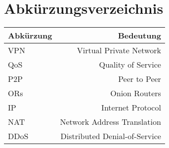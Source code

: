 \section{Abkürzungsverzeichnis}

\begin{tabular}{l|r}
    Abkürzung & Bedeutung \\
    \hline
    VPN & Virtual Private Network \\
    QoS & Quality of Service \\
    P2P & Peer to Peer \\
    ORs & Onion Routers \\
    IP & Internet Protocol \\
    NAT & Network Address Translation \\
    DDoS & Distributed Denial-of-Service \\
\end{tabular}